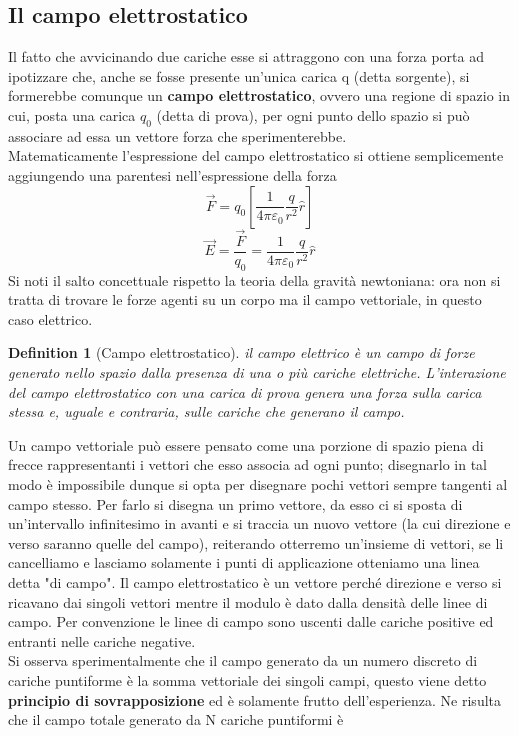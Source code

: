 \documentclass[10pt,a4paper]{article}
\newtheorem{definition}{Definition}
\begin{document}
\subsection{Il campo elettrostatico}
Il fatto che avvicinando due cariche esse si attraggono con una forza porta ad ipotizzare che, anche se fosse presente un'unica carica q (detta sorgente), si formerebbe comunque un \textbf{campo elettrostatico}, ovvero una regione di spazio in cui, posta una carica \(q_0\) (detta di prova), per ogni punto dello spazio si può associare ad essa un vettore forza che sperimenterebbe.\\
Matematicamente l'espressione del campo elettrostatico si ottiene semplicemente aggiungendo una parentesi nell'espressione della forza 
\[\vec{F}=q_0\left[\frac{1}{4\pi\varepsilon_0}\frac{q}{r^2}\hat{r}\right]\]
\[\vec{E} = \frac{\vec{F}}{q_0} = \frac{1}{4\pi\varepsilon_0}\frac{q}{r^2}\hat{r}\]
Si noti il salto concettuale rispetto la teoria della gravità newtoniana: ora non si tratta di trovare le forze agenti su un corpo ma il campo vettoriale, in questo caso elettrico.
\begin{definition}[Campo elettrostatico]
	 il campo elettrico è un campo di forze generato nello spazio dalla presenza di una o più cariche elettriche. L'interazione del campo elettrostatico con una carica di prova genera una forza sulla carica stessa e, uguale e contraria, sulle cariche che generano il campo.
\end{definition}
Un campo vettoriale può essere pensato come una porzione di spazio piena di frecce rappresentanti i vettori che esso associa ad ogni punto; disegnarlo in tal modo è impossibile dunque si opta per disegnare pochi vettori sempre tangenti al campo stesso. Per farlo si disegna un primo vettore, da esso ci si sposta di un'intervallo infinitesimo in avanti e si traccia un nuovo vettore (la cui direzione e verso saranno quelle del campo), reiterando otterremo un'insieme di vettori, se li cancelliamo e lasciamo solamente i punti di applicazione otteniamo una linea detta "di campo". Il campo elettrostatico è un vettore perché direzione e verso si ricavano dai singoli vettori mentre il modulo è dato dalla densità delle linee di campo. Per convenzione le linee di campo sono uscenti dalle cariche positive ed entranti nelle cariche negative.\\
Si osserva sperimentalmente che il campo generato da un numero discreto di cariche puntiforme è la somma vettoriale dei singoli campi, questo viene detto \textbf{principio di sovrapposizione} ed è solamente frutto dell'esperienza. Ne risulta che il campo totale generato da N cariche puntiformi è
\end{document}

